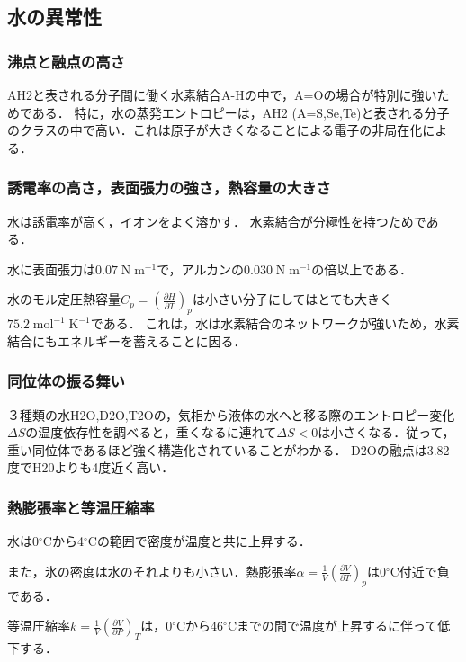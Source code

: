 \documentclass[uplatex, dvipdfmx]{jsreport}
\begin{document}
\subsection{水の異常性}

\subsubsection{沸点と融点の高さ}

AH2と表される分子間に働く水素結合A-Hの中で，A=Oの場合が特別に強いためである．
特に，水の蒸発エントロピーは，AH2 (A=S,Se,Te)と表される分子のクラスの中で高い．これは原子が大きくなることによる電子の非局在化による．

\subsubsection{誘電率の高さ，表面張力の強さ，熱容量の大きさ}

水は誘電率が高く，イオンをよく溶かす．
水素結合が分極性を持つためである．

水に表面張力は$0.07\;\mathrm{N\; m^{-1}}$で，アルカンの$0.030\;\mathrm{N\; m^{-1}}$の倍以上である．

水のモル定圧熱容量$C_p=\left( \frac{\partial H}{\partial T} \right)_p$は小さい分子にしてはとても大きく$75.2\;\mathrm{mol^{-1}\;K^{-1}}$である．
これは，水は水素結合のネットワークが強いため，水素結合にもエネルギーを蓄えることに因る．

\subsubsection{同位体の振る舞い}

３種類の水H2O,D2O,T2Oの，気相から液体の水へと移る際のエントロピー変化$\Delta S$の温度依存性を調べると，重くなるに連れて$\Delta S<0$は小さくなる．従って，重い同位体であるほど強く構造化されていることがわかる．
D2Oの融点は3.82度でH20よりも4度近く高い．

\subsubsection{熱膨張率と等温圧縮率}

水は0$^\circ\mathrm{C}$から4$^\circ\mathrm{C}$の範囲で密度が温度と共に上昇する．

また，氷の密度は水のそれよりも小さい．熱膨張率$\alpha=\frac{1}{V}\left(\frac{\partial V}{\partial T}\right)_p$は0$^\circ\mathrm{C}$付近で負である．

等温圧縮率$k=\frac{1}{V}\left(\frac{\partial V}{\partial P}\right)_T$は，0$^\circ\mathrm{C}$から46$^\circ\mathrm{C}$までの間で温度が上昇するに伴って低下する．
\end{document}
